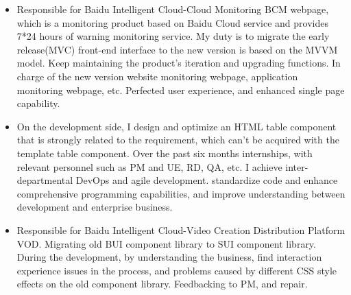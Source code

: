 \documentclass{resume}
\newcommand{\en}[1]{#1}
\newcommand{\zh}[1]{}
\begin{document}
\en{}
\zh{\datedsubsection{\textbf{\href{https://cloud.baidu.com/}{百度智能云（Baidu AI Cloud）}}}{2021/01 -- 2021/08}}
\en{}
\zh{\role{ACG建站与云市场部}{前端研发实习}}
\begin{itemize}
      \item \en{Responsible for Baidu Intelligent Cloud-Cloud Monitoring BCM webpage, which is a monitoring product based on Baidu Cloud service and provides 7*24 hours of warning monitoring service. My duty is to migrate the early release(MVC) front-end interface to the new version is based on the MVVM model. Keep maintaining the product's iteration and upgrading functions. In charge of the new version website monitoring webpage, application monitoring webpage, etc. Perfected user experience, and enhanced single page capability.}
            \zh{负责百度智能云-云监控BCM，BCM是依托于百度云的监控产品，提供7*24小时的报警监控服务，本人的工作是对老版本前端界面迁移至新版本的开发工作，维护功能的迭代和升级，负责过新版站点监控，应用监控等，基于Er框架页面重构至San框架。提升用户体验，同时提高单页面应用交互能力。}
      \item \en{On the development side, I design and optimize an HTML table component that is strongly related to the requirement, which can't be acquired with the template table component. Over the past six months internships, with relevant personnel such as PM and UE, RD, QA, etc. I achieve inter-departmental DevOps and agile development. standardize code and enhance comprehensive programming capabilities, and improve understanding between development and enterprise business.}
            \zh{在开发方面，遇到无法用组件库的需求，自己设计并优化出一个与需求强相关的可选表格。在过去半年的时间内，通过实习，配合PM和UE，RD，QA等相关人员实现部门间的DevOps和敏捷开发，规范代码并提升综合工程能力，在开发与企业业务之间的理解上也得到提升。}
      \item \en{Responsible for Baidu Intelligent Cloud-Video Creation Distribution Platform VOD. Migrating old BUI component library to SUI component library. During the development, by understanding the business, find interaction experience issues in the process, and problems caused by different CSS style effects on the old component library. Feedbacking to PM, and repair.}
            \zh{负责百度智能云-视频创作分发平台VOD，迁移老式BUI组件库至SUI组件库，在开发时，通过了解业务，发现流 程上的体验问题，以及老式组件库对不同浏览器的样式效果不同导致的问题，及时反馈和修复。}
\end{itemize}
\end{document}
